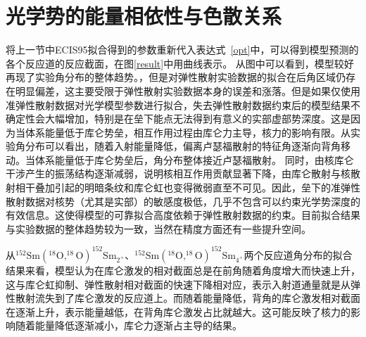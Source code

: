 \section{光学势的能量相依性与色散关系}

将上一节中ECIS95拟合得到的参数重新代入表达式~\eqref{opt}中，可以得到模型预测的各个反应道的反应截面，在图\ref{result}中用曲线表示。
从图中可以看到，模型较好再现了实验角分布的整体趋势。，但是对弹性散射实验数据的拟合在后角区域仍存在明显偏差，这主要受限于弹性散射实验数据本身的误差和涨落。但是如果仅使用准弹性散射数据对光学模型参数进行拟合，失去弹性散射数据约束后的模型结果不确定性会大幅增加，特别是在垒下能点无法得到有意义的实部虚部势深度。这是因为当体系能量低于库仑势垒，相互作用过程由库仑力主导，核力的影响有限。从实验角分布可以看出，随着入射能量降低，偏离卢瑟福散射的特征角逐渐向背角移动。当体系能量低于库仑势垒后，角分布整体接近卢瑟福散射。
同时，由核库仑干涉产生的振荡结构逐渐减弱，说明核相互作用贡献显著下降，由库仑散射与核散射相干叠加引起的明暗条纹和库仑虹也变得微弱直至不可见。因此，垒下的准弹性散射数据对核势（尤其是实部）的敏感度极低，几乎不包含可以约束光学势深度的有效信息。这使得模型的可靠拟合高度依赖于弹性散射数据的约束。目前拟合结果与实验数据的整体趋势较为一致，当然在精度方面还有一些提升空间。

从$^{152}\mathrm{Sm}(^{18}\mathrm{O},^{18}\mathrm{O})^{152}\mathrm{Sm}_{2^+}$、$^{152}\mathrm{Sm}(^{18}\mathrm{O},^{18}\mathrm{O})^{152}\mathrm{Sm}_{4^+}$两个反应道角分布的拟合结果来看，模型认为在库仑激发的相对截面总是在前角随着角度增大而快速上升，这与库仑虹抑制、弹性散射相对截面的快速下降相对应，表示入射道通量就是从弹性散射流失到了库仑激发的反应道上。而随着能量降低，背角的库仑激发相对截面在逐渐上升，表示能量越低，在背角库仑激发占比就越大。这可能反映了核力的影响随着能量降低逐渐减小，库仑力逐渐占主导的结果。


